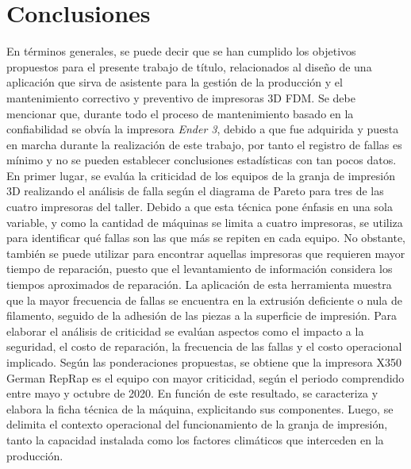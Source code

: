\chapter{Conclusiones}
\label{cap:conc}

En términos generales, se puede decir que se han cumplido los objetivos propuestos para el presente trabajo de título, relacionados al diseño de una aplicación que sirva de asistente para la gestión de la producción y el mantenimiento correctivo y preventivo de impresoras 3D FDM.  Se debe mencionar que, durante todo el proceso de mantenimiento basado en la confiabilidad se obvía la impresora \textit{Ender 3}, debido a que fue adquirida y puesta en marcha durante la realización de este trabajo, por tanto el registro de fallas es mínimo y no se pueden establecer conclusiones estadísticas con tan pocos datos. En primer lugar, se evalúa la criticidad de los equipos de la granja de impresión 3D realizando el análisis de falla según el diagrama de Pareto para tres de las cuatro impresoras del taller. Debido a que esta técnica pone énfasis en una sola variable, y como la cantidad de máquinas se limita a cuatro impresoras, se utiliza para identificar qué fallas son las que más se repiten en cada equipo. No obstante, también se puede utilizar para encontrar aquellas impresoras que requieren mayor tiempo de reparación, puesto que el levantamiento de información considera los tiempos aproximados de reparación. La aplicación de esta herramienta muestra que la mayor frecuencia de fallas se encuentra en la extrusión deficiente o nula de filamento, seguido de la adhesión de las piezas a la superficie de impresión. 
Para elaborar el análisis de criticidad se evalúan aspectos como el impacto a la seguridad, el costo de reparación, la frecuencia de las fallas y el costo operacional implicado. Según las ponderaciones propuestas, se obtiene que la impresora X350 German RepRap es el equipo con mayor criticidad, según el periodo comprendido entre mayo y octubre de 2020. En función de este resultado, se caracteriza y elabora la ficha técnica de la máquina, explicitando sus componentes. Luego, se delimita el contexto operacional del funcionamiento de la granja de impresión, tanto la capacidad instalada como los factores climáticos que interceden en la producción.
